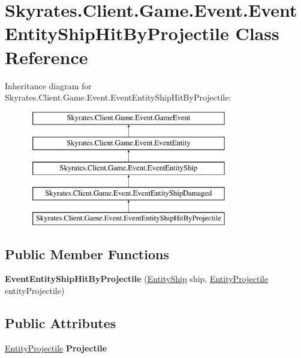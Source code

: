 \hypertarget{class_skyrates_1_1_client_1_1_game_1_1_event_1_1_event_entity_ship_hit_by_projectile}{\section{Skyrates.\-Client.\-Game.\-Event.\-Event\-Entity\-Ship\-Hit\-By\-Projectile Class Reference}
\label{class_skyrates_1_1_client_1_1_game_1_1_event_1_1_event_entity_ship_hit_by_projectile}
}
Inheritance diagram for Skyrates.\-Client.\-Game.\-Event.\-Event\-Entity\-Ship\-Hit\-By\-Projectile\-:\begin{figure}[H]
\begin{center}
\leavevmode
\includegraphics[height=5.000000cm]{class_skyrates_1_1_client_1_1_game_1_1_event_1_1_event_entity_ship_hit_by_projectile}
\end{center}
\end{figure}
\subsection*{Public Member Functions}
\begin{DoxyCompactItemize}
\item 
\hypertarget{class_skyrates_1_1_client_1_1_game_1_1_event_1_1_event_entity_ship_hit_by_projectile_a2f6190f0ccb89e7aa3e2660b0f88f04c}{{\bfseries Event\-Entity\-Ship\-Hit\-By\-Projectile} (\hyperlink{class_skyrates_1_1_common_1_1_entity_1_1_entity_ship}{Entity\-Ship} ship, \hyperlink{class_entity_projectile}{Entity\-Projectile} entity\-Projectile)}\label{class_skyrates_1_1_client_1_1_game_1_1_event_1_1_event_entity_ship_hit_by_projectile_a2f6190f0ccb89e7aa3e2660b0f88f04c}

\end{DoxyCompactItemize}
\subsection*{Public Attributes}
\begin{DoxyCompactItemize}
\item 
\hypertarget{class_skyrates_1_1_client_1_1_game_1_1_event_1_1_event_entity_ship_hit_by_projectile_a278251a91678e0e27991998354e16455}{\hyperlink{class_entity_projectile}{Entity\-Projectile} {\bfseries Projectile}}\label{class_skyrates_1_1_client_1_1_game_1_1_event_1_1_event_entity_ship_hit_by_projectile_a278251a91678e0e27991998354e16455}

\end{DoxyCompactItemize}
